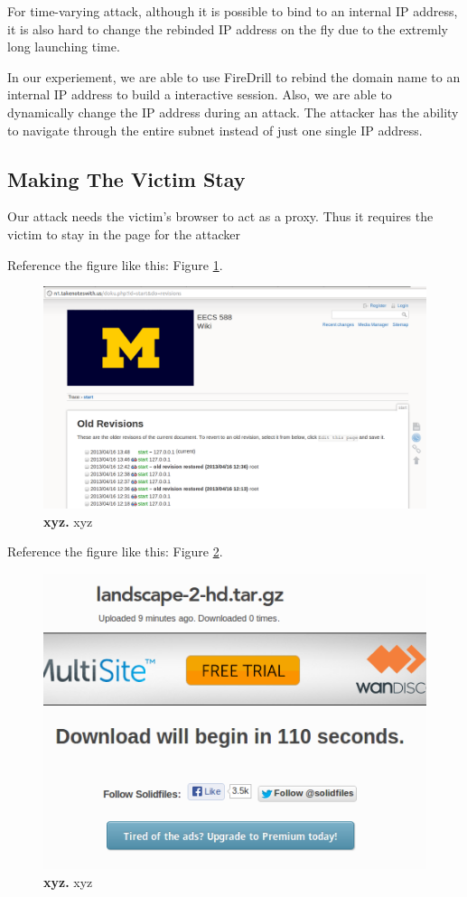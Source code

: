 For time-varying attack, although it is possible to bind to an internal IP address, it is also hard to change the rebinded IP address on the fly due to the extremly long launching time. 

In our experiement, we are able to use FireDrill to rebind the domain name to an internal IP address to build a interactive session. Also, we are able to dynamically change the IP address during an attack. The attacker has the ability to navigate through the entire subnet instead of just one single IP address.

\subsection{Making The Victim Stay}
Our attack needs the victim's browser to act as a proxy. Thus it requires the victim to stay in the page for the attacker 



Reference the figure like this: Figure \ref{fig:oldrevisions}.
\begin{figure}[h]
\centering
\includegraphics[width=0.8\columnwidth]{oldrevisions.png}
\caption{\textbf{xyz.} xyz}
\label{fig:oldrevisions}
\end{figure}


Reference the figure like this: Figure \ref{fig:download}.
\begin{figure}[h]
\centering
\includegraphics[width=0.8\columnwidth]{download.png}
\caption{\textbf{xyz.} xyz}
\label{fig:download}
\end{figure}
